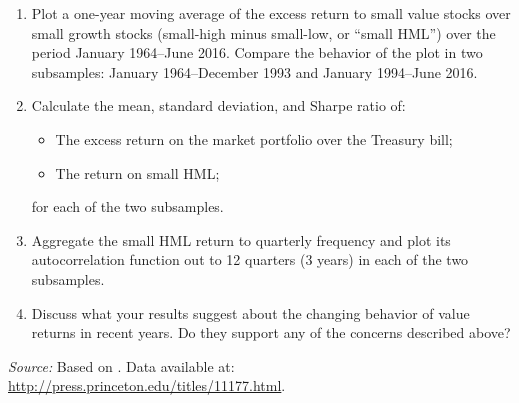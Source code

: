 \documentclass[12pt]{article}
\begin{document}
\begin{enumerate}[label=\textbf{(\alph*)}]
\begin{enumerate}[label=\textbf{(\roman*)}]
    \begin{enumerate}[label=\textbf{(\roman*)}]
        \item Plot a one-year moving average of the excess return to small value stocks over small growth stocks (small-high minus small-low, or ``small HML'') over the period January 1964–June 2016. Compare the behavior of the plot in two subsamples: January 1964–December 1993 and January 1994–June 2016.

        \item Calculate the mean, standard deviation, and Sharpe ratio of:
        \begin{itemize}
            \item The excess return on the market portfolio over the Treasury bill;
            \item The return on small HML;
        \end{itemize}
        for each of the two subsamples.

        \item Aggregate the small HML return to quarterly frequency and plot its autocorrelation function out to 12 quarters (3 years) in each of the two subsamples.

        \item Discuss what your results suggest about the changing behavior of value returns in recent years. Do they support any of the concerns described above?
    \end{enumerate}
    \end{enumerate}
\end{enumerate}

\vspace{1em}

\noindent\textit{Source:} Based on \textcite{CampbellVuolteenaho2004}.  
Data available at: \url{http://press.princeton.edu/titles/11177.html}.
\end{document}
